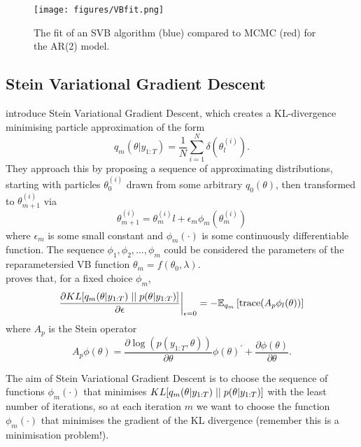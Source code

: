 \documentclass[
12pt, %
onehalfspacing, %
nohyperref, %
headsepline, %
chapterinoneline, %
]{MastersDoctoralThesis} %
\begin{document}
\begin{figure}[htbp]
\centering
\texttt{[image: figures/VBfit.png]}
\caption{The fit of an SVB algorithm (blue) compared to MCMC (red) for the AR(2) model.}
\label{fig:SVB}
\end{figure}

\subsection{Stein Variational Gradient Descent}
\label{subsec:Stein}

\cite{Liu2016} introduce Stein Variational Gradient Descent, which creates a KL-divergence minimising particle approximation of the form
\begin{equation}
\label{Stein:Approx}
q_m(\theta | y_{1:T}) = \frac{1}{N}\sum_{i=1}^N \delta(\theta^{(i)}_l).
\end{equation} 
They approach this by proposing a sequence of approximating distributions, starting with particles $\theta^{(i)}_0$ drawn from some arbitrary $q_{0}(\theta)$, then transformed to $\theta^{(i)}_{m+1}$ via
\begin{equation}
\label{Stein:Transform}
\theta^{(i)}_{m+1} = \theta^{(i)}_ml + \epsilon_m \phi_m(\theta^{(i)}_m)
\end{equation}
where $\epsilon_m$ is some small constant and $\phi_m(\cdot)$ is some continuously differentiable function. The sequence $\phi_1, \phi_2, \ldots, \phi_m$ could be considered the parameters of the reparametersied VB function $\theta_m = f(\theta_0, \lambda)$.
\\

\cite{Liu2016} proves that, for a fixed choice $\phi_m$, 
\begin{equation}
\label{Stein:Derivative}
\frac{\partial KL[q_m(\theta | y_{1:T}) \hspace{1mm} || \hspace{1mm} p(\theta | y_{1:T})]}{\partial \epsilon} \bigg \vert_{\epsilon = 0} = - \mathbb{E}_{q_m} \left[ \mbox{trace}(A_p \phi_l(\theta)) \right]
\end{equation}
where $A_p$ is the Stein operator
\begin{equation}
\label{Stein:Operator}
A_p \phi(\theta) = \frac{\partial \log(p(y_{1:T}, \theta))}{\partial \theta} \phi(\theta)^{\prime} + \frac{\partial \phi(\theta)}{\partial \theta}.
\end{equation}

The aim of Stein Variational Gradient Descent is to choose the sequence of functions $\phi_m(\cdot)$ that minimises $KL[q_m(\theta | y_{1:T}) \hspace{1mm} || \hspace{1mm} p(\theta | y_{1:T})]$ with the least number of iterations, so at each iteration $m$ we want to choose the function $\phi_m(\cdot)$ that minimises the gradient of the KL divergence (remember this is a minimisation problem!).
\\
\end{document}

